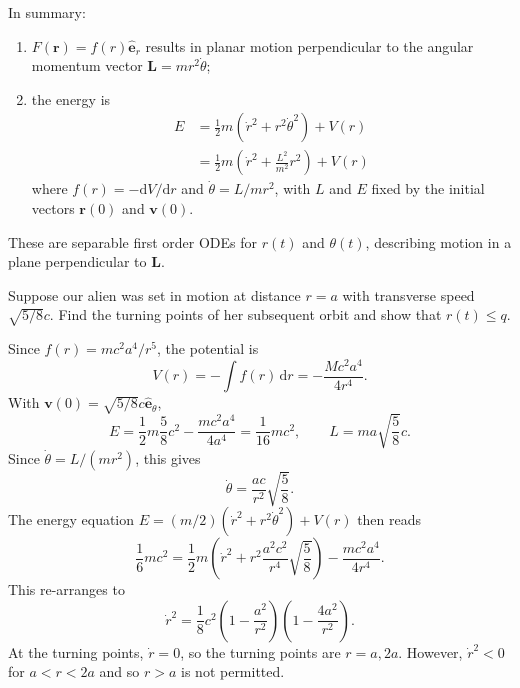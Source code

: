 \documentclass[letter-paper]{tufte-book}
\newenvironment{example}[1][Example]{\begin{trivlist}
\item[\hskip \labelsep {\bfseries #1}]}{\end{trivlist}}
\newcommand{\eb}{\boldsymbol{e}}
\newcommand{\Lb}{\boldsymbol{L}}
\newcommand{\rb}{\boldsymbol{r}}
\newcommand{\vb}{\boldsymbol{v}}
\begin{document}
In summary:
\begin{enumerate}
  \item $F(\rb) = f(r)\hat{\eb}_r$ results in planar motion perpendicular to the
  angular momentum vector $\Lb = mr^2\dot{\theta}$;
  \item the energy is
  \begin{equation*}\begin{aligned}
    E &= \frac{1}{2} m\left(\dot{r}^2 + r^2\dot{\theta}^2\right) + V(r)\\
      &= \frac{1}{2} m\left(\dot{r}^2 + \frac{L^2}{m^2}{r^2}\right) + V(r)
  \end{aligned}\end{equation*}
  where $f(r) = -\mathrm{d}V/\mathrm{d}r$ and $\dot{\theta} = L / mr^2$, with
  $L$ and $E$ fixed by the initial vectors $\rb(0)$ and $\vb(0)$.
\end{enumerate}
These are separable first order ODEs for $r(t)$ and $\theta(t)$, describing
motion in a plane perpendicular to $\Lb$.

\begin{example}
  Suppose our alien was set in motion at distance $r=a$ with transverse speed
  $\sqrt{5/8} c$. Find the turning points of her subsequent orbit and show that
  $r(t)\leq q$.
  
  Since $f(r) = mc^2a^4/r^5$, the potential is
  \begin{equation*}
    V(r) = -\int f(r)\, \mathrm{d}r = -\frac{Mc^2 a^4}{4r^4}.
  \end{equation*}
  With $\vb(0) = \sqrt{5/8}c \hat{\eb}_{\theta}$,
  \begin{equation*}
    E = \frac{1}{2}m\frac{5}{8}c^2 - \frac{mc^2a^4}{4a^4} = \frac{1}{16}mc^2,
    \qquad L = ma\sqrt{\frac{5}{8}}c.
  \end{equation*}
  Since $\dot{\theta} = L/(mr^2)$, this gives
  \begin{equation*}
    \dot{\theta} = \frac{ac}{r^2}\sqrt{\frac{5}{8}}.
  \end{equation*}
  The energy equation $E = (m/2)(\dot{r}^2 + r^2\dot{\theta}^2) + V(r)$
  then reads
  \begin{equation*}
    \frac{1}{6}mc^2 = \frac{1}{2}m \left(\dot{r}^2 + 
      r^2\frac{a^2 c^2}{r^4}\sqrt{\frac{5}{8}}\right) - \frac{mc^2 a^4}{4r^4}.
  \end{equation*}
  This re-arranges to
  \begin{equation*}
    \dot{r}^2 = \frac{1}{8}c^2 \left(1 - \frac{a^2}{r^2}\right)
      \left(1 - \frac{4a^2}{r^2}\right).
  \end{equation*}
  At the turning points, $\dot{r}=0$, so the turning points are $r=a, 2a$.
  However, $\dot{r}^2 < 0$ for $a < r < 2a$ and so $r > a$ is not permitted.
\end{example}
\end{document}
